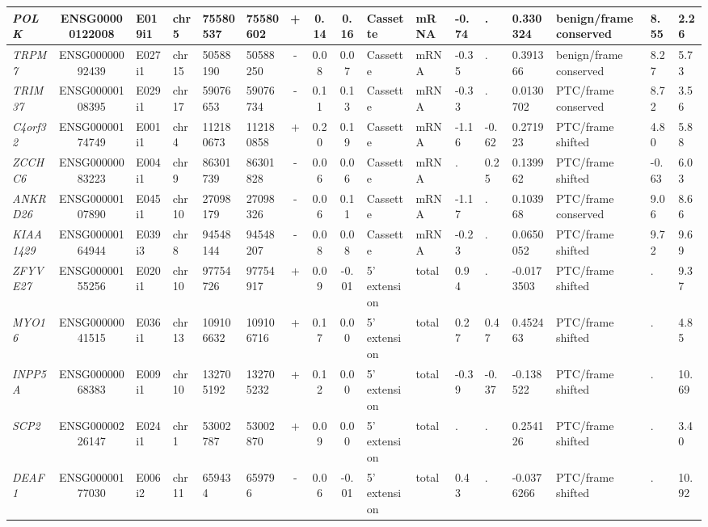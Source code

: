 \begin{landscape}
\begin{table}
{\begin{tabular}{|l|c|l|l|l|l|c|c|c|l|l|l|l|l|l|l|l|}
		\textit{POLK} & ENSG00000122008 & E019i1 & chr5  & 75580537 & 75580602 & +     & 0.14  & 0.16  & Cassette & mRNA  & -0.74 & . & 0.330324 & benign/frame conserved & 8.55  &  2.26 \\ \hline
		\textit{TRPM7} & ENSG00000092439 & E027i1 & chr15 & 50588190 & 50588250 & -     & 0.08  & 0.07  & Cassette & mRNA  & -0.35 & . & 0.391366 & benign/frame conserved & 8.27  &  5.73 \\ \hline
		\textit{TRIM37} & ENSG00000108395 & E029i1 & chr17 & 59076653 & 59076734 & -     & 0.11  & 0.13  & Cassette & mRNA  & -0.33 & . & 0.0130702 & PTC/frame conserved & 8.72  &  3.56 \\ \hline
		\textit{C4orf32} & ENSG00000174749 & E001i1 & chr4  & 112180673 & 112180858 & +     & 0.20  & 0.19  & Cassette & mRNA  & -1.16 & -0.62 & 0.271923 & PTC/frame shifted & 4.80  &  5.88 \\ \hline
		\textit{ZCCHC6} & ENSG00000083223 & E004i1 & chr9  & 86301739 & 86301828 & -     & 0.06  & 0.06  & Cassette & mRNA  & . & 0.25  & 0.139962 & PTC/frame shifted & -0.63 &  6.03 \\ \hline
		\textit{ANKRD26} & ENSG00000107890 & E045i1 & chr10 & 27098179 & 27098326 & -     & 0.06  & 0.11  & Cassette & mRNA  & -1.17 & . & 0.103968 & PTC/frame conserved & 9.06  &  8.66 \\ \hline
		\textit{KIAA1429} & ENSG00000164944 & E039i3 & chr8  & 94548144 & 94548207 & -     & 0.08  & 0.08  & Cassette & mRNA  & -0.23 & . & 0.0650052 & PTC/frame shifted & 9.72  &  9.69 \\ \hline
		\textit{ZFYVE27} & ENSG00000155256 & E020i1 & chr10 & 97754726 & 97754917 & +     & 0.09  & -0.01 & 5' extension & total & 0.94  & . & -0.0173503 & PTC/frame shifted & . &  9.37 \\ \hline
		\textit{MYO16} & ENSG00000041515 & E036i1 & chr13 & 109106632 & 109106716 & +     & 0.17  & 0.00  & 5' extension & total & 0.27  & 0.47  & 0.452463 & PTC/frame shifted & . &  4.85 \\ \hline
		\textit{INPP5A} & ENSG00000068383 & E009i1 & chr10 & 132705192 & 132705232 & +     & 0.12  & 0.00  & 5' extension & total & -0.39 & -0.37 & -0.138522 & PTC/frame shifted & . &  10.69 \\ \hline
		\textit{SCP2} & ENSG00000226147 & E024i1 & chr1  & 53002787 & 53002870 & +     & 0.09  & 0.00  & 5' extension & total & . & . & 0.254126 & PTC/frame shifted & . &  3.40 \\ \hline
		\textit{DEAF1} & ENSG00000177030 & E006i2 & chr11 & 659434 & 659796 & -     & 0.06  & -0.01 & 5' extension & total & 0.43  & . & -0.0376266 & PTC/frame shifted & . &  10.92 \\ \hline

\end{tabular}}
\end{table}
\end{landscape}

